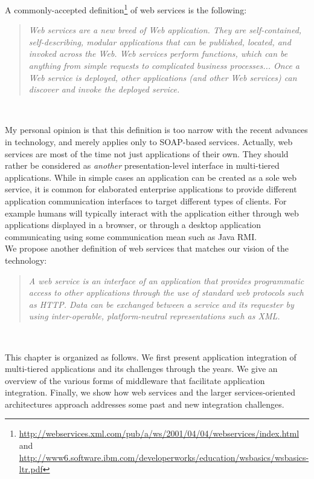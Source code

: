 
A commonly-accepted definition\footnote{\url{http://webservices.xml.com/pub/a/ws/2001/04/04/webservices/index.html} and \url{http://www6.software.ibm.com/developerworks/education/wsbasics/wsbasics-ltr.pdf}} of web services is the following:
\begin{quote}
\textsl{
Web services are a new breed of Web application. They are self-contained, self-describing, modular applications that can be published, located, and invoked across the Web. Web services perform functions, which can be anything from simple requests to complicated business processes... Once a Web service is deployed, other applications (and other Web services) can discover and invoke the deployed service.
}
\end{quote}\

My personal opinion is that this definition is too narrow with the recent advances in technology, and merely applies only to SOAP-based services. Actually, web services are most of the time not just applications of their own. They should rather be considered as \emph{another} presentation-level interface in multi-tiered applications. While in simple cases an application can be created as a sole web service, it is common for elaborated enterprise applications to provide different application communication interfaces to target different types of clients. For example humans will typically interact with the application either through web applications displayed in a browser, or through a desktop application communicating using some communication mean such as Java RMI.\\

We propose another definition of web services that matches our vision of the technology:
\begin{quote}
\textsl{
A web service is an interface of an application that provides programmatic access to other applications through the use of standard web protocols such as HTTP. Data can be exchanged between a service and its requester by using inter-operable, platform-neutral representations such as XML.
}
\end{quote}\

This chapter is organized as follows. We first present application integration of multi-tiered applications and its challenges through the years. We give an overview of the various forms of middleware that facilitate application integration. Finally, we show how web services and the larger services-oriented architectures approach addresses some past and new integration challenges.\\


